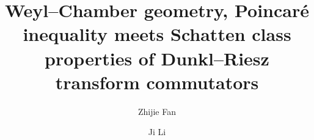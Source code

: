 \documentclass[12pt]{amsart}
\begin{document}
 \baselineskip 16.6pt
\hfuzz=6pt


\newtheorem{cl}{Claim}
\newtheorem{theorem}{Theorem}[section]
\newtheorem{proposition}[theorem]{Proposition}
\newtheorem{coro}[theorem]{Corollary}
\newtheorem{lemma}[theorem]{Lemma}
\newtheorem{definition}[theorem]{Definition}
\newtheorem{nota}[theorem]{Notation}
\newtheorem{assum}{Assumption}[section]
\newtheorem{example}[theorem]{Example}
\newtheorem{remark}[theorem]{Remark}
\renewcommand{\theequation}
{\thesection.\arabic{equation}}

\def\SL{\sqrt H}

\newcommand{\mar}[1]{{\marginpar{\sffamily{\scriptsize
        #1}}}}

\newcommand{\as}[1]{{\mar{AS:#1}}}
\newcommand{\cE}{\mathcal{E}}
\newcommand\R{\mathbb{R}}
\newcommand\RR{\mathbb{R}}
\newcommand\CC{\mathbb{C}}
\newcommand\D {{\rm Dunkl}}
\newcommand\NN{\mathbb{N}}
\newcommand\N {{\bf N}}
\newcommand\ZZ{\mathbb{Z}}
\newcommand\HH{\mathbb{H}}
\newcommand\Z{\mathbb{Z}}
\def\RN {\mathbb{R}^n}
\renewcommand\Re{\operatorname{Re}}
\renewcommand\Im{\operatorname{Im}}

\newcommand{\mc}{\mathcal}

\def\hs{\hspace{0.33cm}}
\newcommand{\la}{\alpha}
\def \l {\alpha}
\newcommand{\eps}{\tau}
\newcommand{\pl}{\partial}
\newcommand{\supp}{{\rm supp}{\hspace{.05cm}}}
\newcommand{\x}{\times}
\newcommand{\lag}{\langle}
\newcommand{\rag}{\rangle}

\newcommand\wrt{\,{\rm d}}

\newcommand{\norm}[2]{|#1|_{#2}}
\newcommand{\Norm}[2]{\|#1\|_{#2}}

\title[Schatten class properties of Dunkl--Riesz transform commutators]{Weyl--Chamber geometry, Poincar\'e inequality meets Schatten class properties of Dunkl--Riesz transform commutators}



\author{Zhijie Fan}
\address{Zhijie Fan, School of Mathematical Sciences, South China Normal University, Guangzhou 510631, China}







\author{Ji Li}
\address{Ji Li, Department of Mathematics, Macquarie University,NSW2109, Australia}
\end{document}
